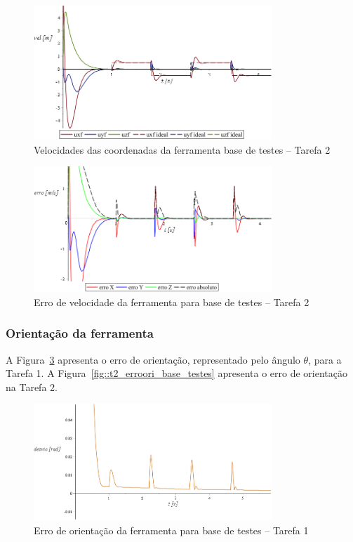 \begin{figure}[h!]
	\centering 
 	\includegraphics[width=0.80\textwidth]{figs/t2_velf_base_testes}
 	\caption{Velocidades das coordenadas da ferramenta base de testes --
 	Tarefa 2}
 	\label{fig::t2_velf_base_testes}
\end{figure}

\begin{figure}[h!]
	\centering 
 	\includegraphics[width=0.80\textwidth]{figs/t2_errovelf_base_testes}
 	\caption{Erro de velocidade da ferramenta para base de testes --
 	Tarefa 2}
 	\label{fig::t2_errovelf_base_testes}
\end{figure}


\subsubsection{Orientação da ferramenta}

A Figura~\ref{fig::t1_erroori_base_testes} apresenta o erro de orientação,
representado pelo ângulo $\theta$, para a Tarefa 1. A
Figura~\ref{fig::t2_erroori_base_testes} apresenta o erro de orientação na
Tarefa 2.

\begin{figure}[h!]
	\centering 
 	\includegraphics[width=0.80\textwidth]{figs/t1_erroori_base_testes}
 	\caption{Erro de orientação da ferramenta para base de testes -- Tarefa
 	1}
 	\label{fig::t1_erroori_base_testes}
\end{figure}

